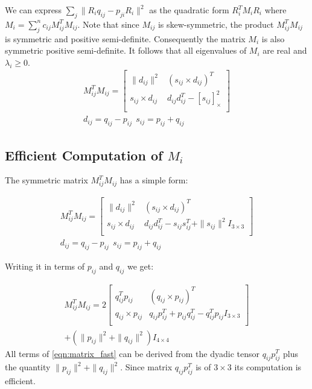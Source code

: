 \documentclass{birkjour}
\numberwithin{equation}{section}
\begin{document}
We can express $\sum_j \|R_i q_{ij} - p_{ji} R_i\|^2$ as the quadratic form $R_i^T M_i R_i$ where $M_i = \sum_j^n { c_{ij} M_{ij}^T M_{ij}}$. Note that since $M_{ij}$ is skew-symmetric, the product $M_{ij}^T M_{ij}$ is symmetric and positive semi-definite.
Consequently the matrix $M_i$ is also symmetric positive semi-definite. It follows that all eigenvalues of $M_i$ are real and $\lambda_i \geq 0$.
\begin{eqnarray}
	M_{ij}^T M_{ij} = 
	\left[\begin{array}{cc}
		\| d_{ij} \|^2       &         (s_{ij} \times d_{ij})^T \\
		s_{ij} \times d_{ij}  &    d_{ij} d_{ij}^T - \left[ s_{ij} \right]^2_\times \\
	\end{array}\right]\\
	d_{ij} = q_{ij} - p_{ij} \ \ s_{ij} = p_{ij} + q_{ij}  \nonumber
\end{eqnarray}


 \subsection{Efficient Computation of $M_i$}

The symmetric matrix $M_{ij}^T M_{ij}$ has a simple form:

\begin{eqnarray*}
	M_{ij}^T M_{ij} = 
	\left[\begin{array}{cc}
		\| d_{ij} \|^2        &         (s_{ij} \times d_{ij})^T \\
		s_{ij} \times d_{ij}  &    d_{ij} d_{ij}^T - s_{ij} s_{ij}^T + \| s_{ij} \|^2 I_{3\times3} \\
	\end{array}\right]\\
     d_{ij} = q_{ij} - p_{ij} \ \ s_{ij} = p_{ij} + q_{ij}  \nonumber
\end{eqnarray*}

Writing it in terms of $p_{ij}$ and $q_{ij}$ we get:

\begin{eqnarray}
   \label{eqn:matrix_fast}
   	M_{ij}^T M_{ij} 
   	= 2
	\left[\begin{array}{cc}
		q_{ij}^T p_{ij}       &         (q_{ij} \times p_{ij})^T \\
		q_{ij} \times p_{ij}  &    q_{ij} p_{ij}^T + p_{ij} q_{ij}^T - q_{ij}^T p_{ij} I_{3\times3} \\
	\end{array}\right]\\ \nonumber
    + (\| p_{ij} \|^2 + \| q_{ij} \|^2) I_{4\times4}
\end{eqnarray}
All terms of \ref{eqn:matrix_fast} can be derived from the dyadic tensor $q_{ij} p_{ij}^T$ plus the quantity $\|p_{ij} \|^2 + \| q_{ij} \|^2$. Since matrix $q_{ij} p_{ij}^T$ is of $3\times3$ its computation is efficient. 
\end{document}
